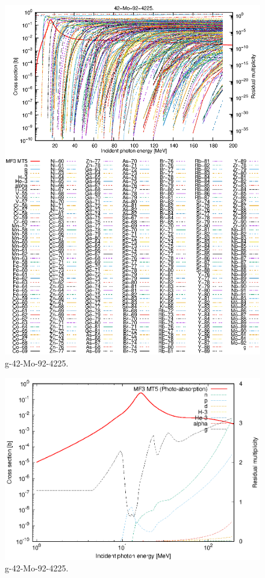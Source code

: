 \begin{figure}
 \includegraphics[width=\linewidth]{eps/g_42-Mo-92_4225.eps}
  \caption{g-42-Mo-92-4225.}
\end{figure}
\newpage \clearpage

\begin{figure}
 \includegraphics[width=\linewidth]{eps-log/g_42-Mo-92_4225.eps}
 \caption{g-42-Mo-92-4225.}
\end{figure}
\newpage \clearpage

